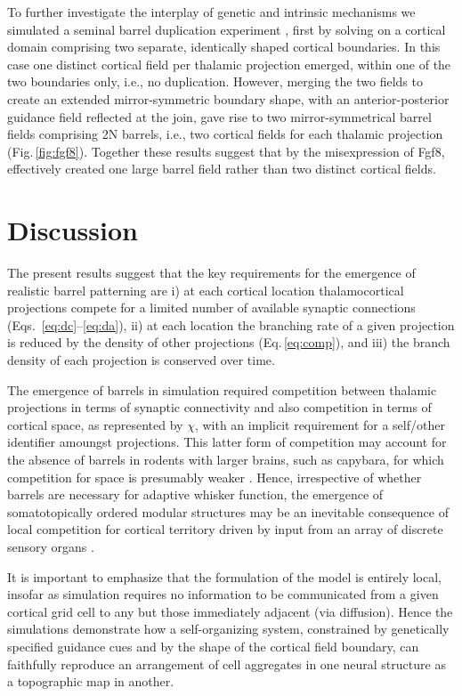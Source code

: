 \documentclass[9pt,lineno]{elife}
\begin{document}
To further investigate the interplay of genetic and intrinsic mechanisms we
simulated a seminal barrel duplication experiment
\citep{shimogori_fibroblast_2005}, first by solving on a cortical domain
comprising two separate, identically shaped cortical boundaries. In this case
one distinct cortical field per thalamic projection emerged, within one of the
two boundaries only, i.e., no duplication. However, merging the two fields to
create an extended mirror-symmetric boundary shape, with an anterior-posterior
guidance field reflected at the join, gave rise to two mirror-symmetrical
barrel fields comprising 2N barrels, i.e., two cortical fields for each
thalamic projection (Fig.\,\ref{fig:fgf8}). Together these results suggest that by the
misexpression of Fgf8, \cite{shimogori_fibroblast_2005}
effectively created one large barrel field rather than two distinct cortical
fields.

\section{Discussion}

The present results suggest that the key requirements for the emergence of
realistic barrel patterning are i) at each cortical location thalamocortical
projections compete for a limited number of available synaptic connections
(Eqs.~\ref{eq:dc}--\ref{eq:da}), ii) at each location the branching rate of a
given projection is reduced by the density of other projections
(Eq.\,\ref{eq:comp}), and iii) the branch density of each projection is
conserved over time.

The emergence of barrels in simulation required competition between thalamic
projections in terms of synaptic connectivity and also competition in terms of
cortical space, as represented by $\chi$, with an implicit requirement for a
self/other identifier amoungst projections. This latter form of competition may
account for the absence of barrels in rodents with larger brains, such as
capybara, for which competition for space is presumably weaker
\citep{woolsey_comparative_1975}. Hence, irrespective of whether barrels are
necessary for adaptive whisker function, the emergence of somatotopically
ordered modular structures may be an inevitable consequence of local
competition for cortical territory driven by input from an array of discrete
sensory organs \citep{purves_iterated_1992}.

It is important to emphasize that the formulation of the model is entirely
local, insofar as simulation requires no information to be communicated from a
given cortical grid cell to any but those immediately adjacent (via
diffusion). Hence the simulations demonstrate how a self-organizing system,
constrained by genetically specified guidance cues and by the shape of the
cortical field boundary, can faithfully reproduce an arrangement of cell
aggregates in one neural structure as a topographic map in another.
\end{document}
